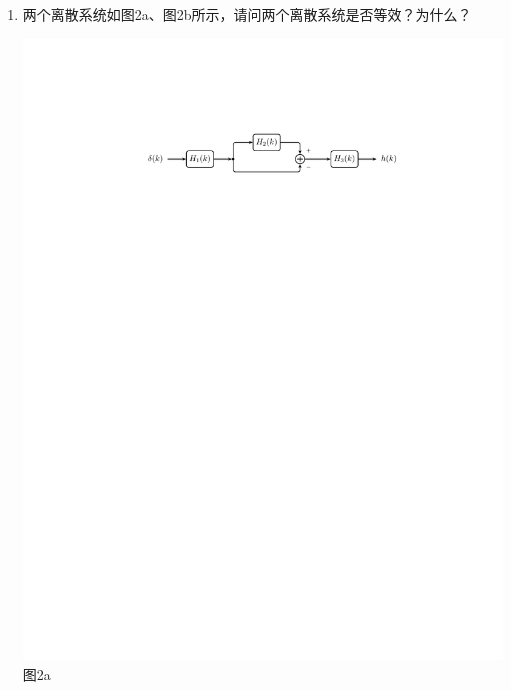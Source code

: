 \documentclass[11pt]{ctexart}
\begin{document}
\begin{enumerate}[leftmargin=0em]
\item 两个离散系统如图2a、图2b所示，请问两个离散系统是否等效？为什么？
\begin{center}
\includegraphics{img/6.pdf}\\
图2a\\

\end{center}
\end{enumerate}
\end{document}
